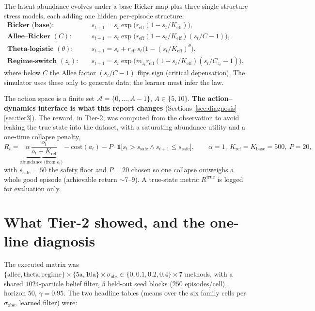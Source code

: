 \documentclass[11pt]{article}
\newcommand{\reff}{r_{\mathrm{eff}}}
\newcommand{\Keff}{K_{\mathrm{eff}}}
\newcommand{\Kbase}{K_{\mathrm{base}}}
\newcommand{\Kref}{K_{\mathrm{ref}}}
\newcommand{\sobs}{\sigma_{\mathrm{obs}}}
\newcommand{\sthr}{s_{\mathrm{safe}}}
\newcommand{\Rtrue}{R^{\mathrm{true}}}
\begin{document}
The latent abundance evolves under a base Ricker map plus three single-structure
stress models, each adding one hidden per-episode structure:
\begin{align}
\textbf{Ricker (base):}\quad
& s_{t+1}=s_t\exp\!\big(\reff(1-s_t/\Keff)\big),\\
\textbf{Allee--Ricker } (C):\quad
& s_{t+1}=s_t\exp\!\big(\reff(1-s_t/\Keff)(s_t/C-1)\big),\\
\textbf{Theta-logistic } (\theta):\quad
& s_{t+1}=s_t+\reff\,s_t\big(1-(s_t/\Keff)^{\theta}\big),\\
\textbf{Regime-switch } (z_t):\quad
& s_{t+1}=s_t\exp\!\big(m_{z_t}\reff(1-s_t/\Keff)(s_t/C_{z_t}-1)\big),
\end{align}
where below $C$ the Allee factor $(s_t/C-1)$ flips sign (critical depensation).
The simulator uses these only to generate data; the learner must infer the law.

The action space is a finite set $\mathcal{A}=\{0,\dots,A-1\}$, $A\in\{5,10\}$.
\textbf{The action--dynamics interface is what this report changes}
(Sections~\ref{sec:diagnosis}--\ref{sec:tier3}). The reward, in Tier-2, was
computed from the observation to avoid leaking the true state into the dataset,
with a saturating abundance utility and a one-time collapse penalty,
\begin{equation}
R_t=\underbrace{\alpha\,\frac{o_t}{o_t+\Kref}}_{\text{abundance (from }o_t\text{)}}
-\mathrm{cost}(a_t)-P\cdot\mathbb{1}\big[s_t>\sthr\wedge s_{t+1}\le\sthr\big],
\qquad \alpha{=}1,\ \Kref{=}\Kbase{=}500,\ P{=}20,
\label{eq:reward}
\end{equation}
with $\sthr{=}50$ the safety floor and $P{=}20$ chosen so one collapse outweighs a
whole good episode (achievable return $\sim 7$--$9$). A true-state metric $\Rtrue$
is logged for evaluation only.

\section{What Tier-2 showed, and the one-line diagnosis}
\label{sec:results}
The executed matrix was
$\{\text{allee},\text{theta},\text{regime}\}\times\{5\mathrm{a},10\mathrm{a}\}
\times\sobs\!\in\!\{0,0.1,0.2,0.4\}\times 7$ methods, with a shared $1024$-particle
belief filter, $5$ held-out seed blocks ($250$ episodes/cell), horizon $50$,
$\gamma{=}0.95$. The two headline tables (means over the six family cells per
$\sobs$, learned filter) were:
\end{document}
